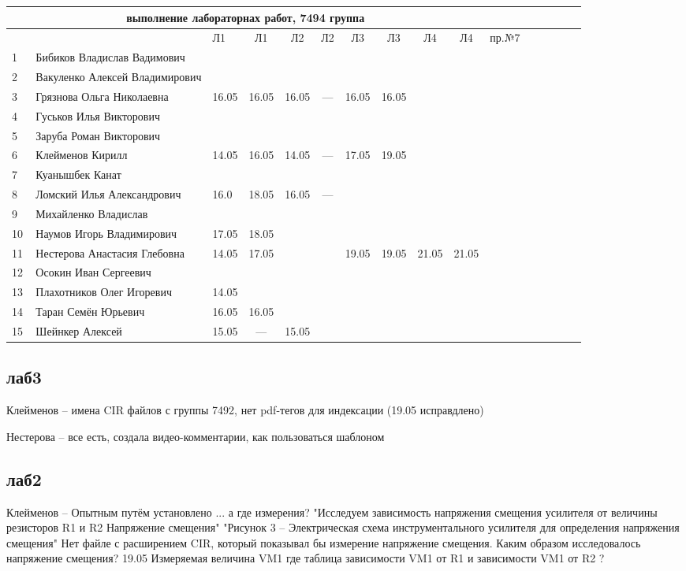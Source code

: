 \documentclass[a4paper,11pt]{article}
\begin{document}
\newpage
%
\begin{tabular}{l|llccccccccccccc}
\multicolumn{10}{c}{выполнение лабораторнах работ, 7494 группа} \\
\toprule
&&Л1&Л1& Л2&Л2& Л3&Л3& Л4&Л4&пр.№7\\ 
\midrule
1\,&Бибиков Владислав Вадимович    &&&&&&&&\\
2\,&Вакуленко Алексей Владимирович &&&&&&&&\\
3\,&Грязнова Ольга Николаевна      &16.05&16.05&16.05& --- &16.05&16.05&&\\
4\,&Гуськов Илья Викторович        &&&&&&&&\\
5\,&Заруба Роман Викторович        &&&&&&&&\\
\midrule
6\,&Клейменов Кирилл               &14.05&16.05&14.05& --- &17.05&19.05&&\\
7\,&Куанышбек Канат                &&&&&&&&\\
8\,&Ломский Илья Александрович     &16.0&18.05&16.05& --- &&&&\\
9\,&Михайленко Владислав           &&&&&&&&\\
10\,&Наумов Игорь Владимирович     &17.05&18.05&&&&&&\\
\midrule
11\,&Нестерова Анастасия Глебовна  &14.05&17.05& & &19.05&19.05&21.05&21.05\\
12\,&Осокин Иван Сергеевич         &&&&&&&&\\
13\,&Плахотников Олег Игоревич     &14.05&&&&&&&\\
14\,&Таран Семён Юрьевич           &16.05&16.05&&&&&&\\
15\,&Шейнкер Алексей               &15.05& --- &15.05&&&&&\\

\bottomrule
\end{tabular}

\newpage
\subsection*{лаб3}

Клейменов -- имена CIR файлов с группы 7492, нет pdf-тегов для индексации (19.05 исправдлено)

Нестерова -- все есть, создала видео-комментарии, как пользоваться шаблоном

\newpage
\subsection*{лаб2}
Клейменов -- Опытным путём установлено ... а где измерения? 
 "Исследуем зависимость напряжения смещения усилителя от величины резисторов R1 и R2 Напряжение смещения"
"Рисунок 3 – Электрическая схема инструментального усилителя для определения напряжения смещения"
Нет файле с расширением CIR, который показывал бы измерение напряжение смещения.
Каким образом исследовалось напряжение смещения?
19.05 Измеряемая величина VM1 где таблица зависимости VM1 от R1 и зависимости VM1 от R2 ?
\end{document}
